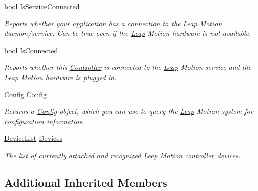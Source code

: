 \begin{DoxyCompactItemize}
bool \mbox{\hyperlink{class_leap_1_1_controller_a8ecf0fd02e617da823b46b5f73b38eb0}{Is\+Service\+Connected}}
\begin{DoxyCompactList}\small\item\em Reports whether your application has a connection to the \mbox{\hyperlink{namespace_leap}{Leap}} Motion daemon/service. Can be true even if the \mbox{\hyperlink{namespace_leap}{Leap}} Motion hardware is not available. \end{DoxyCompactList}\item 
bool \mbox{\hyperlink{class_leap_1_1_controller_aac7cccf354ef1a6f1f01222a9b63d8bd}{Is\+Connected}}
\begin{DoxyCompactList}\small\item\em Reports whether this \mbox{\hyperlink{class_leap_1_1_controller}{Controller}} is connected to the \mbox{\hyperlink{namespace_leap}{Leap}} Motion service and the \mbox{\hyperlink{namespace_leap}{Leap}} Motion hardware is plugged in. \end{DoxyCompactList}\item 
\mbox{\hyperlink{class_leap_1_1_config}{Config}} \mbox{\hyperlink{class_leap_1_1_controller_a12503273371b21d58952a99b5fc5b0d9}{Config}}
\begin{DoxyCompactList}\small\item\em Returns a \mbox{\hyperlink{class_leap_1_1_config}{Config}} object, which you can use to query the \mbox{\hyperlink{namespace_leap}{Leap}} Motion system for configuration information. \end{DoxyCompactList}\item 
\mbox{\hyperlink{class_leap_1_1_device_list}{Device\+List}} \mbox{\hyperlink{class_leap_1_1_controller_aa5e641f54418e5194161ac45dc15c7fb}{Devices}}
\begin{DoxyCompactList}\small\item\em The list of currently attached and recognized \mbox{\hyperlink{namespace_leap}{Leap}} Motion controller devices. \end{DoxyCompactList}\end{DoxyCompactItemize}
\subsection*{Additional Inherited Members}


